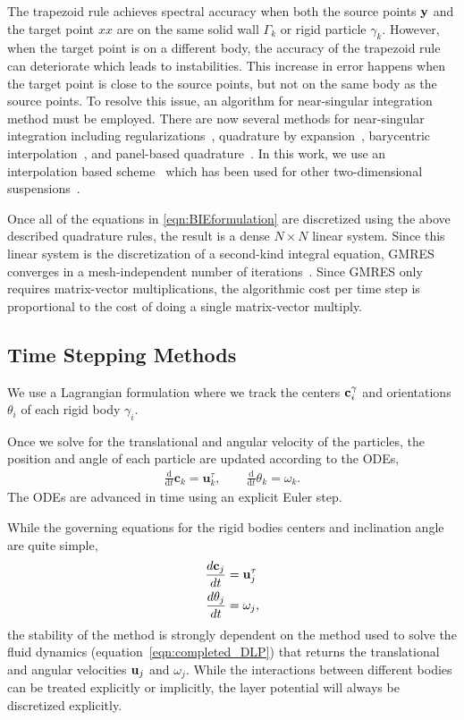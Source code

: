 \documentclass[preprint, 10pt]{elsarticle}
\begin{document}
The trapezoid rule achieves spectral accuracy when both the source
points ${\mathbf{y}}$ and the target point $xx$ are on the same solid wall
$\Gamma_k$ or rigid particle $\gamma_k$.  However, when the target point
is on a different body, the accuracy of the trapezoid rule can
deteriorate which leads to instabilities.  This increase in error
happens when the target point is close to the source points, but not on
the same body as the source points.  To resolve this issue, an algorithm
for near-singular integration method must be employed.  There are now
several methods for near-singular integration including
regularizations~\cite{bea-yin-wil2016, bea-lai2001}, quadrature by
expansion~\cite{Klockner2013}, barycentric
interpolation~\cite{bar-wu-vee2015}, and panel-based
quadrature~\cite{hel-oja2008}.  In this work, we use an interpolation
based scheme~\cite{Ying2006} which has been used for other
two-dimensional suspensions~\cite{Quaife2014}.

Once all of the
equations in \eqref{eqn:BIEformulation} are discretized using the above described
quadrature rules, the result is a dense $N \times N$ linear system.
Since this linear system is the discretization of a second-kind integral
equation, GMRES~\cite{Saad1986} converges in a mesh-independent number of
iterations~\cite{cam-ips-kel-mey-xue1996}.  Since GMRES only requires
matrix-vector multiplications, the algorithmic cost per time step is
proportional to the cost of doing a single matrix-vector multiply.


\subsection{Time Stepping Methods}\label{sec:temporal}

We use a Lagrangian formulation where we track the centers
${\mathbf{c}}_i^\gamma$ and orientations $\theta_i$ of each rigid body
$\gamma_i$. 

Once we solve for the translational and angular velocity of the
particles, the position and angle of each particle are updated according
to the ODEs,
\begin{align*}
  \frac{\text{d}}{\text{d}t}\mathbf{c}_k = \mathbf{u}^\tau_k, \qquad
  \frac{\text{d}}{\text{d}t}\theta_k =\omega_k.
\end{align*}
The ODEs are advanced in time using an explicit Euler step. 

While the governing equations for the rigid bodies centers and
inclination angle are quite simple,
\begin{align*}
  \frac{d{\mathbf{c}}_j}{dt} &= {\mathbf{u}}_j^\tau \\
  \frac{d\theta_j}{dt} &=\omega_j,
\end{align*}
the stability of the method is strongly dependent on the method used to
solve the fluid dynamics (equation~\eqref{eqn:completed_DLP}) that
returns the translational and angular velocities ${\mathbf{u}}_j$ and $\omega_j$.
While the interactions between different bodies can be treated
explicitly or implicitly, the layer potential will always be discretized
explicitly.
\end{document}
